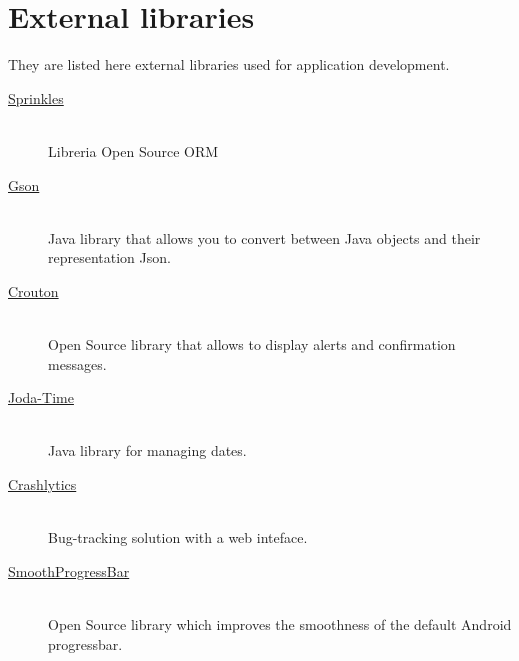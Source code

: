 


\chapter{External libraries}
They are listed here external libraries used for application development.

		\begin{description}

			\item[\href{https://github.com/emilsjolander/sprinkles}{Sprinkles}] \hfill \\
			Libreria Open Source ORM

			\item[\href{https://code.google.com/p/google-gson/}{Gson}] \hfill \\
			Java library that allows you to convert between Java objects and their representation Json.

			\item[\href{https://github.com/keyboardsurfer/Crouton}{Crouton}] \hfill \\
			Open Source library that allows to display alerts and confirmation messages.

			\item[\href{http://www.joda.org/joda-time/}{Joda-Time}] \hfill \\
			Java library for managing dates.

			\item[\href{https://try.crashlytics.com/}{Crashlytics}] \hfill \\
			Bug-tracking solution with a web inteface.

			\item[\href{https://github.com/castorflex/SmoothProgressBar}{SmoothProgressBar}] \hfill \\
			Open Source library which improves the smoothness of the default Android progressbar.

		\end{description}